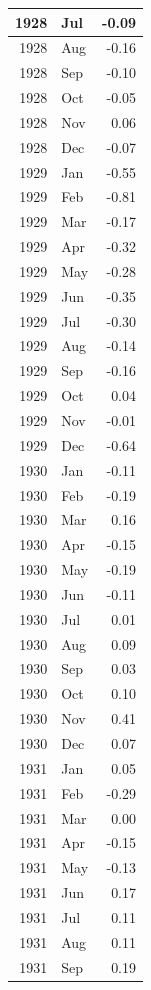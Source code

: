 \documentclass[
]{article}
\begin{document}
\begin{table}[H]
\begin{tabular}[t]{r|l|r}
\hline
1928 & Jul & -0.09\\
\hline
1928 & Aug & -0.16\\
\hline
1928 & Sep & -0.10\\
\hline
1928 & Oct & -0.05\\
\hline
1928 & Nov & 0.06\\
\hline
1928 & Dec & -0.07\\
\hline
1929 & Jan & -0.55\\
\hline
1929 & Feb & -0.81\\
\hline
1929 & Mar & -0.17\\
\hline
1929 & Apr & -0.32\\
\hline
1929 & May & -0.28\\
\hline
1929 & Jun & -0.35\\
\hline
1929 & Jul & -0.30\\
\hline
1929 & Aug & -0.14\\
\hline
1929 & Sep & -0.16\\
\hline
1929 & Oct & 0.04\\
\hline
1929 & Nov & -0.01\\
\hline
1929 & Dec & -0.64\\
\hline
1930 & Jan & -0.11\\
\hline
1930 & Feb & -0.19\\
\hline
1930 & Mar & 0.16\\
\hline
1930 & Apr & -0.15\\
\hline
1930 & May & -0.19\\
\hline
1930 & Jun & -0.11\\
\hline
1930 & Jul & 0.01\\
\hline
1930 & Aug & 0.09\\
\hline
1930 & Sep & 0.03\\
\hline
1930 & Oct & 0.10\\
\hline
1930 & Nov & 0.41\\
\hline
1930 & Dec & 0.07\\
\hline
1931 & Jan & 0.05\\
\hline
1931 & Feb & -0.29\\
\hline
1931 & Mar & 0.00\\
\hline
1931 & Apr & -0.15\\
\hline
1931 & May & -0.13\\
\hline
1931 & Jun & 0.17\\
\hline
1931 & Jul & 0.11\\
\hline
1931 & Aug & 0.11\\
\hline
1931 & Sep & 0.19\\

\end{tabular}
\end{table}
\end{document}

